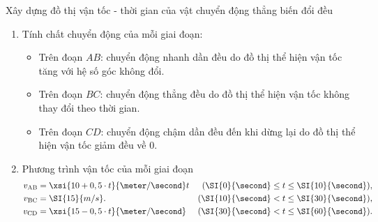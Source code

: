 \begin{dang}{Xây dựng đồ thị vận tốc - thời gian của vật chuyển động thẳng biến đổi đều}
{		\begin{enumerate}[label=\alph*.]
			\item Tính chất chuyển động của mỗi giai đoạn:
			\begin{itemize}
				\item Trên đoạn $AB$: chuyển động nhanh dần đều do đồ thị thể hiện vận tốc tăng với hệ số góc không đổi.
				\item Trên đoạn $BC$: chuyển động thẳng đều do đồ thị thể hiện vận tốc không thay đổi theo thời gian.
				\item Trên đoạn $CD$: chuyển động chậm dần đều đến khi dừng lại do đồ thị thể hiện vận tốc giảm đều về 0.
			\end{itemize}
			\item Phương trình vận tốc của mỗi giai đoạn	
			\begin{align*}
				v_\text{AB}& = \xsi{10 +0,5\cdot t}{\meter/\second} t&(\SI{0}{\second}\leq t \leq \SI{10}{\second}),\\
				v_\text{BC} &= \SI{15}{m/s}.&(\SI{10}{\second}<t\leq \SI{30}{\second}),\\
				v_\text{CD} &= \xsi{15 - 0,5\cdot t}{\meter/\second} & (\SI{30}{\second} < t \leq \SI{60}{\second}).
			\end{align*}
		\end{enumerate}
		
	}
	
\end{dang}
